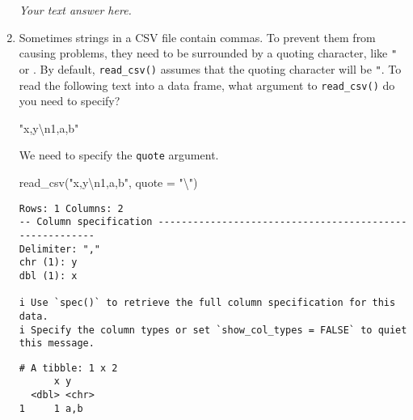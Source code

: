 \documentclass[
  letterpaper,
  DIV=11,
  numbers=noendperiod]{scrreprt}
\newenvironment{Shaded}{\begin{snugshade}}{\end{snugshade}}
\newcommand{\AttributeTok}[1]{\textcolor[rgb]{0.40,0.45,0.13}{#1}}
\newcommand{\FunctionTok}[1]{\textcolor[rgb]{0.28,0.35,0.67}{#1}}
\newcommand{\NormalTok}[1]{\textcolor[rgb]{0.00,0.23,0.31}{#1}}
\newcommand{\SpecialCharTok}[1]{\textcolor[rgb]{0.37,0.37,0.37}{#1}}
\newcommand{\StringTok}[1]{\textcolor[rgb]{0.13,0.47,0.30}{#1}}
\begin{document}
\begin{enumerate}
\begin{tcolorbox}
  \emph{Your text answer here.}

  \end{tcolorbox}
\item
  Sometimes strings in a CSV file contain commas. To prevent them from
  causing problems, they need to be surrounded by a quoting character,
  like \texttt{"} or \texttt{\textquotesingle{}}. By default,
  \texttt{read\_csv()} assumes that the quoting character will be
  \texttt{"}. To read the following text into a data frame, what
  argument to \texttt{read\_csv()} do you need to specify?

\begin{Shaded}
\begin{Highlighting}[]
\StringTok{"x,y}\SpecialCharTok{\textbackslash{}n}\StringTok{1,\textquotesingle{}a,b\textquotesingle{}"}
\end{Highlighting}
\end{Shaded}

  \begin{tcolorbox}[enhanced jigsaw, left=2mm, rightrule=.15mm, bottomtitle=1mm, opacitybacktitle=0.6, leftrule=.75mm, opacityback=0, colframe=quarto-callout-note-color-frame, bottomrule=.15mm, coltitle=black, toptitle=1mm, colback=white, titlerule=0mm, colbacktitle=quarto-callout-note-color!10!white, title={Answer}, toprule=.15mm, breakable, arc=.35mm]

  We need to specify the \texttt{quote} argument.

\begin{Shaded}
\begin{Highlighting}[]
\FunctionTok{read\_csv}\NormalTok{(}\StringTok{"x,y}\SpecialCharTok{\textbackslash{}n}\StringTok{1,\textquotesingle{}a,b\textquotesingle{}"}\NormalTok{, }\AttributeTok{quote =} \StringTok{"}\SpecialCharTok{\textbackslash{}\textquotesingle{}}\StringTok{"}\NormalTok{)}
\end{Highlighting}
\end{Shaded}

\begin{verbatim}
Rows: 1 Columns: 2
-- Column specification --------------------------------------------------------
Delimiter: ","
chr (1): y
dbl (1): x

i Use `spec()` to retrieve the full column specification for this data.
i Specify the column types or set `show_col_types = FALSE` to quiet this message.
\end{verbatim}

\begin{verbatim}
# A tibble: 1 x 2
      x y    
  <dbl> <chr>
1     1 a,b  
\end{verbatim}


\end{tcolorbox}
\end{enumerate}
\end{document}
